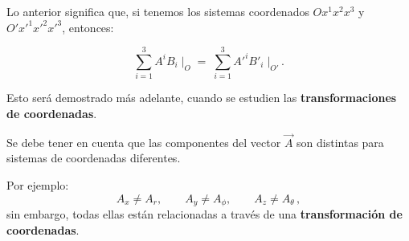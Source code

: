 \documentclass[../apunte_mecanica_clasica.tex]{subfiles}%
\begin{document}
Lo anterior significa que, si tenemos los sistemas coordenados 
$Ox^1x^2x^3$ y $O'x'^1x'^2x'^3$, entonces:

\begin{equation*}
    \sum_{i=1}^3 A^i B_i \;\Big|_{O}
    \;=\;
    \sum_{i=1}^3 A'^i B'_i \;\Big|_{O'} \,.
\end{equation*}

Esto será demostrado más adelante, cuando se estudien las \textbf{transformaciones de coordenadas}.

Se debe tener en cuenta que las componentes del vector $\vec{A}$ 
son distintas para sistemas de coordenadas diferentes.  

Por ejemplo:
\begin{equation*}
    A_x \neq A_r, 
    \qquad A_y \neq A_\phi, 
    \qquad A_z \neq A_\theta \,,
\end{equation*}
sin embargo, todas ellas están relacionadas a través de una 
\textbf{transformación de coordenadas}.


\newpage
\end{document}
